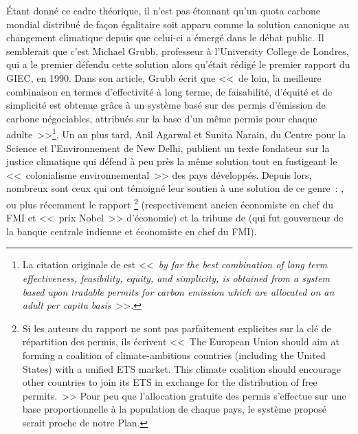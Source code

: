\documentclass[a5paper,french,openany]{memoir}
\begin{document}
Étant donné ce cadre théorique, il n'est pas étonnant qu'un quota carbone mondial distribué de façon égalitaire soit apparu comme la solution canonique au changement climatique depuis que celui-ci a émergé dans le débat public. Il semblerait que c'est Michael Grubb, professeur à l'University College de Londres, qui a le premier défendu cette solution alors qu'était rédigé le premier rapport du GIEC, en 1990. Dans son article, Grubb écrit que <<~de loin, la meilleure combinaison en termes d'effectivité à long terme, de faisabilité, d'équité et de simplicité est obtenue grâce à un système basé sur des permis d'émission de carbone négociables, attribués sur la base d'un même permis pour chaque adulte~>>\footnote{La citation originale de \citet{grubb_greenhouse_1990} est <<~\textit{by far the best combination of long term effectiveness, feasibility, equity, and simplicity, is obtained from a system based upon tradable permits for carbon emission which are allocated on an adult per capita basis}~>>.}. Un an plus tard, Anil Agarwal et Sunita Narain, du Centre pour la Science et l'Environnement de New Delhi, publient un texte fondateur sur la justice climatique qui défend à peu près la même solution tout en fustigeant le <<~colonialisme environnemental~>> des pays développés. %
Depuis lors, nombreux sont ceux qui ont témoigné leur soutien à une solution de ce genre~: \citet{bertram_tradeable_1992,baer_equity_2000,jamieson_climate_2001}, ou plus récemment le rapport \citet{blanchard_major_2021}\footnote{Si les auteurs du rapport ne sont pas parfaitement explicites sur la clé de répartition des permis, ils écrivent <<~The European Union should aim at forming a coalition of climate-ambitious countries (including the United States) with a unified ETS market. This climate coalition should encourage other countries to join its ETS in exchange for the distribution of free permits.~>> Pour peu que l'allocation gratuite des permis s'effectue sur une base proportionnelle à la population de chaque pays, le système proposé serait proche de notre Plan.} (respectivement ancien économiste en chef du FMI et <<~prix Nobel~>> d'économie) et la tribune de \citet{rajan_global_2021} (qui fut gouverneur de la banque centrale indienne et économiste en chef du FMI). 
\end{document}
